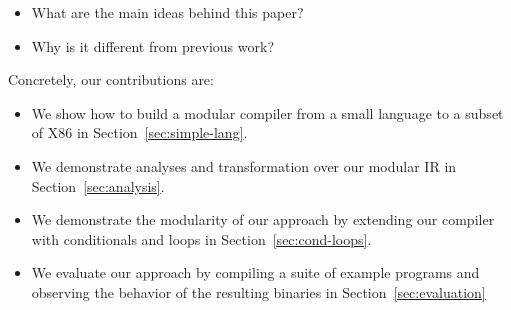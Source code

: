 \documentclass[sigplan,anonymous,review]{acmart}
\begin{document}
% 


\begin{itemize}
  \item What are the main ideas behind this paper?
  \item Why is it different from previous work?
\end{itemize}

Concretely, our contributions are:
\begin{itemize}
  \item We show how to build a modular compiler from a small language to a subset of X86 in Section~\ref{sec:simple-lang}.
  \item We demonstrate analyses and transformation over our modular IR in Section~\ref{sec:analysis}.
  \item We demonstrate the modularity of our approach by extending our compiler with conditionals and loops in Section~\ref{sec:cond-loops}.
  \item We evaluate our approach by compiling a suite of example programs and observing the behavior of the resulting binaries in Section~\ref{sec:evaluation}
\end{itemize}
\end{document}
